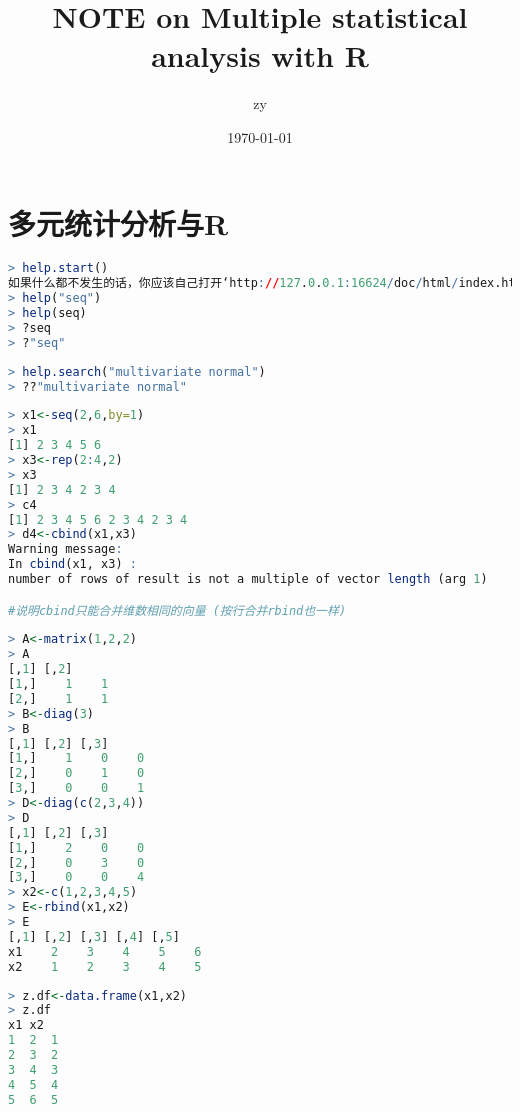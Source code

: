\documentclass[11pt,a4paper,oneside]{book}
\title{\Huge NOTE on Multiple statistical analysis with R}
\author{zy}
\date{\today}
\begin{document}
\maketitle
\tableofcontents  %
\chapter{多元统计分析与R}
\begin{lstlisting}[language=r]
> help.start()
如果什么都不发生的话，你应该自己打开‘http://127.0.0.1:16624/doc/html/index.html’
> help("seq")
> help(seq)
> ?seq
> ?"seq"
\end{lstlisting}
\begin{lstlisting}[language=r]
> help.search("multivariate normal")
> ??"multivariate normal"
\end{lstlisting}
\begin{lstlisting}[language=r]
> x1<-seq(2,6,by=1)
> x1
[1] 2 3 4 5 6
> x3<-rep(2:4,2)
> x3
[1] 2 3 4 2 3 4
> c4
[1] 2 3 4 5 6 2 3 4 2 3 4
> d4<-cbind(x1,x3)
Warning message:
In cbind(x1, x3) :
number of rows of result is not a multiple of vector length (arg 1)

#说明cbind只能合并维数相同的向量 (按行合并rbind也一样)
\end{lstlisting}
\begin{lstlisting}[language=r]
> A<-matrix(1,2,2)
> A
[,1] [,2]
[1,]    1    1
[2,]    1    1
> B<-diag(3)
> B
[,1] [,2] [,3]
[1,]    1    0    0
[2,]    0    1    0
[3,]    0    0    1
> D<-diag(c(2,3,4))
> D
[,1] [,2] [,3]
[1,]    2    0    0
[2,]    0    3    0
[3,]    0    0    4
> x2<-c(1,2,3,4,5)
> E<-rbind(x1,x2)
> E
[,1] [,2] [,3] [,4] [,5]
x1    2    3    4    5    6
x2    1    2    3    4    5
\end{lstlisting}
\begin{lstlisting}[language=r]
> z.df<-data.frame(x1,x2)
> z.df
x1 x2
1  2  1
2  3  2
3  4  3
4  5  4
5  6  5
\end{lstlisting}
\end{document}
